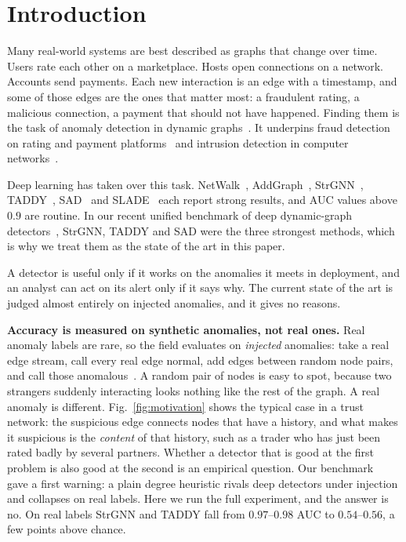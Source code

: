 \documentclass[pdflatex,sn-basic]{sn-jnl}
\theoremstyle{definition}
\theoremstyle{plain}
\begin{document}

\maketitle

\section{Introduction}
\label{sec:intro}

Many real-world systems are best described as graphs that change over
time. Users rate each other on a marketplace. Hosts open connections on a
network. Accounts send payments. Each new interaction is an edge with a
timestamp, and some of those edges are the ones that matter most: a
fraudulent rating, a malicious connection, a payment that should not have
happened. Finding them is the task of anomaly detection in dynamic
graphs~\cite{akoglu2015,ranshous2015,ma2023,ekle2024}. It underpins fraud
detection on rating and payment platforms~\cite{bitcoin2} and intrusion
detection in computer networks~\cite{netwalk,cicids}.

Deep learning has taken over this task. NetWalk~\cite{netwalk},
AddGraph~\cite{addgraph}, StrGNN~\cite{strgnn}, TADDY~\cite{taddy},
SAD~\cite{sad} and SLADE~\cite{slade} each report strong results, and AUC
values above $0.9$ are routine. In our recent unified benchmark of deep
dynamic-graph detectors~\cite{nekka_survey}, StrGNN, TADDY and SAD were the
three strongest methods, which is why we treat them as the state of the art in
this paper.

A detector is useful only if it works on the anomalies it meets in
deployment, and an analyst can act on its alert only if it says why. The
current state of the art is judged almost entirely on injected anomalies, and
it gives no reasons.

\textbf{Accuracy is measured on synthetic anomalies, not real ones.}
Real anomaly labels are rare, so the field evaluates on \emph{injected}
anomalies: take a real edge stream, call every real edge normal, add edges
between random node pairs, and call those anomalous~\cite{netwalk,addgraph,
strgnn,taddy}. A random pair of nodes is easy to spot, because two strangers
suddenly interacting looks nothing like the rest of the graph. A real anomaly
is different. Fig.~\ref{fig:motivation} shows the typical case in a trust
network: the suspicious edge connects nodes that have a history, and what makes
it suspicious is the \emph{content} of that history, such as a trader who has
just been rated badly by several partners. Whether a detector that is good at
the first problem is also good at the second is an empirical question. Our
benchmark~\cite{nekka_survey} gave a first warning: a plain degree heuristic
rivals deep detectors under injection and collapses on real labels. Here we
run the full experiment, and the answer is no. On real labels StrGNN and TADDY
fall from $0.97$--$0.98$ AUC to $0.54$--$0.56$, a few points above chance.
\end{document}
